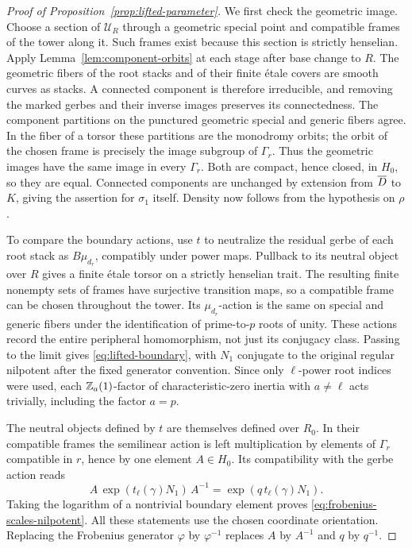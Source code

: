 \begin{proof}[Proof of Proposition~\ref{prop:lifted-parameter}]
We first check the geometric image.  Choose a section of
$\mathscr U_R$ through a geometric special point and compatible
frames of the tower along it.  Such frames exist because this section
is strictly henselian.  Apply Lemma~\ref{lem:component-orbits} at
each stage after base change to $R$.  The geometric fibers of the
root stacks and of their finite \'etale covers are smooth curves as
stacks.  A connected component is therefore irreducible, and removing
the marked gerbes and their inverse images preserves its
connectedness.  The component partitions on the punctured geometric
special and generic fibers agree.  In the fiber of a torsor these
partitions are the monodromy orbits; the orbit of the chosen frame
is precisely the image subgroup of $\Gamma_r$.  Thus the geometric
images have the same image in every $\Gamma_r$.  Both are compact,
hence closed, in $H_0$, so they are equal.  Connected components are
unchanged by extension from $\overline D$ to $K$, giving the assertion for
$\sigma_1$ itself.  Density now follows from the hypothesis on $\rho$.

To compare the boundary actions, use $t$ to neutralize the residual
gerbe of each root stack as $B\mu_{d_r}$, compatibly under power
maps.  Pullback to its neutral object over $R$ gives a finite
\'etale torsor on a strictly henselian trait.  The resulting finite
nonempty sets of frames have surjective transition maps, so a compatible
frame can be chosen throughout the tower.  Its $\mu_{d_r}$-action is
the same on special and generic fibers under the identification of
prime-to-$p$ roots of unity.  These actions record the entire
peripheral homomorphism, not just its conjugacy class.  Passing to
the limit gives \eqref{eq:lifted-boundary}, with $N_1$ conjugate to
the original regular nilpotent after the fixed generator convention.
Since only $\ell$-power root indices were used, each
$\mathbb Z_a(1)$-factor of characteristic-zero inertia with $a\ne\ell$
acts trivially, including the factor $a=p$.

The neutral objects defined by $t$ are themselves defined over $R_0$.
In their compatible frames the semilinear action is left
multiplication by elements of $\Gamma_r$ compatible in $r$, hence
by one element $A\in H_0$.  Its compatibility with the gerbe action
reads
\[
 A\,\exp(t_\ell(\gamma)N_1)\,A^{-1}
      =\exp(q\,t_\ell(\gamma)N_1).
\]
Taking the logarithm of a nontrivial boundary element proves
\eqref{eq:frobenius-scales-nilpotent}.  All these statements use the
chosen coordinate orientation.  Replacing the Frobenius generator
$\varphi$ by $\varphi^{-1}$ replaces $A$ by $A^{-1}$ and $q$ by
$q^{-1}$.


\end{proof}
